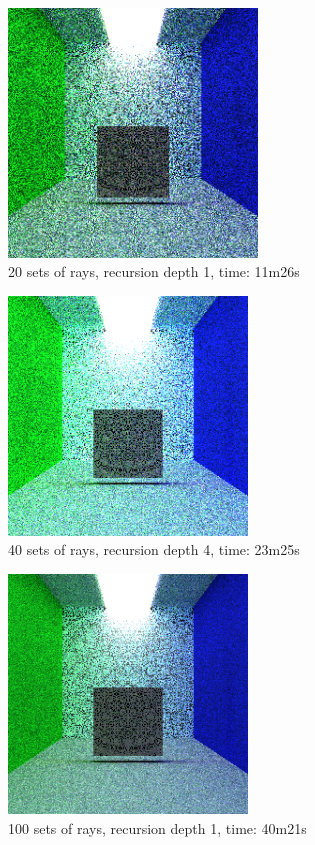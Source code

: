 \documentclass[12pt,journal]{IEEEtran}
\begin{document}
\begin{figure}[!t]

\centering
\includegraphics[width=2.6in]{20s_1d_11m26s}
\caption{20 sets of rays, recursion depth 1, time: 11m26s}
\label{20s_1d_11m26s}

\end{figure}

\begin{figure}[!t]

\centering
\includegraphics[width=2.5in]{40s_4d_23m25s}
\caption{40 sets of rays, recursion depth 4, time: 23m25s}
\label{40s_4d_23m25s}

\end{figure}

\begin{figure}[!t]

\centering
\includegraphics[width=2.5in]{100s_1d_40m21s}
\caption{100 sets of rays, recursion depth 1, time: 40m21s}
\label{100s_1d_40m21s}

\end{figure}
\end{document}

